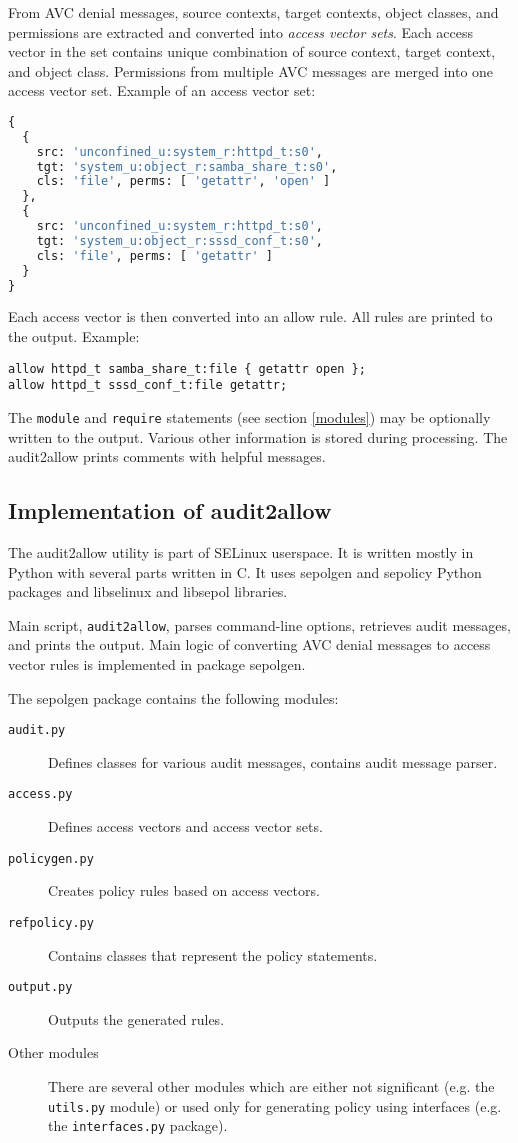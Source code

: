From AVC denial messages, source contexts, target contexts, object classes, and
permissions are extracted and converted into \emph{access vector sets}. Each
access vector in the set contains unique combination of source context, target
context, and object class. Permissions from multiple AVC messages are merged
into one access vector set. Example of an access vector set:
\begin{lstlisting}[language=Python]
{
  {
    src: 'unconfined_u:system_r:httpd_t:s0',
    tgt: 'system_u:object_r:samba_share_t:s0',
    cls: 'file', perms: [ 'getattr', 'open' ]
  },
  {
    src: 'unconfined_u:system_r:httpd_t:s0',
    tgt: 'system_u:object_r:sssd_conf_t:s0',
    cls: 'file', perms: [ 'getattr' ]
  }
}
\end{lstlisting}

Each access vector is then converted into an allow rule. All rules are printed
to the output. Example:
\begin{lstlisting}
allow httpd_t samba_share_t:file { getattr open };
allow httpd_t sssd_conf_t:file getattr;
\end{lstlisting}
The \texttt{module} and \texttt{require} statements (see section \ref{modules})
may be optionally written to the output. Various other information is stored
during processing. The audit2allow prints comments with helpful messages.

\subsection{Implementation of audit2allow}
\label{implementation}
The audit2allow utility is part of SELinux userspace. It is written mostly in
Python with several parts written in C. It uses sepolgen and sepolicy Python
packages and libselinux and libsepol libraries.

Main script, \texttt{audit2allow}, parses command-line options, retrieves audit
messages, and prints the output.  Main logic of converting AVC denial messages
to access vector rules is implemented in package sepolgen.

The sepolgen package contains the following modules:
\begin{description}
    \item [\texttt{audit.py}] Defines classes for various audit messages,
        contains audit message parser.
    \item [\texttt{access.py}] Defines access vectors and access vector sets.
    \item [\texttt{policygen.py}] Creates policy rules based on access vectors.
    \item [\texttt{refpolicy.py}] Contains classes that represent the policy
        statements.
    \item [\texttt{output.py}] Outputs the generated rules.
    \item [Other modules] There are several other modules which are either not
        significant (e.g. the \texttt{utils.py} module) or used only for
        generating policy using interfaces (e.g. the \texttt{interfaces.py}
        package).
\end{description}

